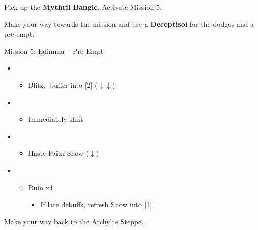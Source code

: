 Pick up the \textbf{Mythril Bangle}.
Activate Mission 5.

Make your way towards the mission and use a \textbf{Deceptisol} for the dodges and a pre-empt.
\vfill
\begin{battle}{Mission 5: Edimmu -- Pre-Empt}
	\begin{itemize}
		\item \sixth
			\begin{itemize}
				\item Blitz, \rav-buffer into [2] ($\downarrow\downarrow$)
			\end{itemize}
		\item \second
			\begin{itemize}
				\item Immediately shift
			\end{itemize}
		\item \fourth
			\begin{itemize}
				\item Haste-Faith Snow ($\downarrow$)
			\end{itemize}
		\item \fifth
			\begin{itemize}
				\item Ruin x4
					\begin{itemize}
						\item If late debuffs, refresh Snow into [1]
					\end{itemize}
			\end{itemize}
	\end{itemize}
\end{battle}

Make your way back to the Archylte Steppe.